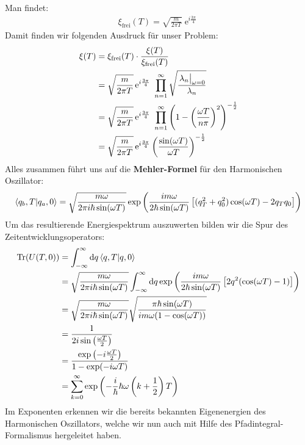 Man findet:
\begin{align}
\xi_{\text{frei}}(T) = \sqrt{\frac{m}{2\pi T}}\operatorname{e}^{i\frac{3\pi}{4}} 	
 \end{align} 
 Damit finden wir folgenden Ausdruck für unser Problem:
 \begin{align}
 	\xi(T) &= \xi_{\text{frei}}(T)\cdot\frac{\xi(T)}{\xi_{\text{frei}}(T)} \nonumber \\
 	&= \sqrt{\frac{m}{2\pi T}}\operatorname{e}^{i\frac{3\pi}{4}} \  \prod_{n=1}^{\infty}\sqrt{\frac{\eval{\lambda_n}_{\omega=0}}{\lambda_n}} \nonumber \\
 	&= \sqrt{\frac{m}{2\pi T}}\operatorname{e}^{i\frac{3\pi}{4}} \  \prod_{n=1}^{\infty} \left(1-\left(\frac{\omega T}{n\pi}\right)^2\right)^{-\frac{1}{2}} \nonumber \\
 	&= \sqrt{\frac{m}{2\pi T}}\operatorname{e}^{i\frac{3\pi}{4}} \left(\frac{\sin(\omega T)}{\omega T}\right)^{-\frac{1}{2}}
 \end{align}
 Alles zusammen führt uns auf die \textbf{Mehler-Formel} für den Harmonischen Oszillator:
 \begin{align}
 	\braket{q_b,T}{q_a,0}= \sqrt{\frac{m\omega}{2\pi i\hbar \sin(\omega T)}} \exp\left(\frac{i m\omega}{2\hbar\sin(\omega T)}\left[(q_T^2+q_0^2)\cos(\omega T)- 2q_Tq_0\right] \right)
 \end{align}
 Um das resultierende Energiespektrum auszuwerten bilden wir die Spur des Zeitentwicklungsoperators: 
 \begin{align}
 	\operatorname{Tr}(U(T,0)) &= \int_{-\infty}^{\infty} \dd q \braket{q,T}{q,0} \nonumber	\\
&=  \sqrt{\frac{m\omega}{2\pi i \hbar\sin(\omega T)}} \int_{-\infty}^{\infty} \dd q  \exp\left(\frac{i m\omega}{2\hbar\sin(\omega T)}\left[2q^2(\cos(\omega T)- 1)\right] \right) \nonumber\\
&= \sqrt{\frac{m\omega}{2\pi i \hbar\sin(\omega T)}}\sqrt{\frac{\pi\hbar\sin(\omega T)}{i m \omega(1-\cos(\omega T))}}\nonumber\\
&= \frac{1}{2 i \sin\left(\frac{\omega T}{2}\right)} \nonumber\\
&= \frac{\exp\left(- i \frac{\omega T}{2}\right)}{1-\exp(-i\omega T)}	\nonumber\\
&= \sum_{k=0}^{\infty} \exp\left(-\frac{i}{\hbar}\hbar\omega\left(k+\frac{1}{2}\right)T\right)
 \end{align}
 Im Exponenten erkennen wir die bereits bekannten Eigenenergien des Harmonischen Oszillators, welche wir nun auch mit Hilfe des Pfadintegral-Formalismus hergeleitet haben.